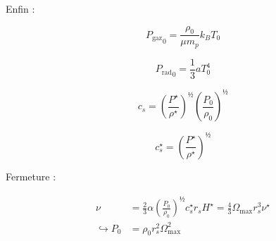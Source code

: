 Enfin :

\begin{equation}
    {P_\mathrm{gaz}}_0 = \frac{\rho_0}{\mu m_p} k_B T_0
\end{equation}

\begin{equation}
    {P_\mathrm{rad}}_0 = \frac{1}{3} a T_0^4
\end{equation}

\begin{equation}
    c_s = \left(\frac{P^\star}{\rho^\star}\right)^½ \left(\frac{P_0}{\rho_0}\right)^½
\end{equation}

\begin{equation}
    c_s^\star = \left(\frac{P^\star}{\rho^\star}\right)^½
\end{equation}

Fermeture :

\begin{align}
    \nu &= \frac{2}{3} \alpha \left(\frac{P_0}{\rho_0}\right)^½ c_s^\star r_s H^\star = \frac{4}{3} \Omega_\mathrm{max} r_s^3 \nu^\star \\
    \hookrightarrow P_0 &= \rho_0 r_s^2 \Omega_\mathrm{max}^2
\end{align}
